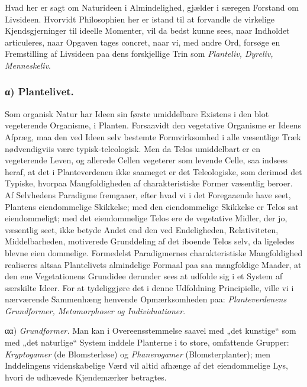 \documentclass[11pt]{book}
\newcommand{\opage}[1]{\marginnote{\footnotesize\textit{[#1]}}}
\begin{document}
\opage{291} \setcounter{footnote}{0}%
Hvad her er sagt om Naturideen i Almindelighed, gjælder i særegen
Forstand om Livsideen. Hvorvidt Philosophien her er istand til at
forvandle de virkelige Kjendsgjerninger til ideelle Momenter, vil da
bedst kunne sees, naar Indholdet articuleres, naar Opgaven tages concret,
naar vi, med andre Ord, forsøge en Fremstilling af Livsideen paa dens
forskjellige Trin som \emph{Planteliv, Dyreliv, Menneskeliv}.

\subsubsection*{α) Plantelivet.}

Som organisk Natur har Ideen sin første umiddelbare Existens i den blot
vegeterende Organisme, i Planten. Forsaavidt den vegetative Organisme er
Ideens Afpræg, maa den ved Ideen selv bestemte Formvirksomhed i alle
væsentlige Træk nødvendigviis være typisk-teleologisk. Men da Telos
umiddelbart er en vegeterende Leven, og allerede Cellen vegeterer som
levende Celle, saa indsees heraf, at det i Planteverdenen ikke saameget
er det Teleologiske, som derimod det Typiske, hvorpaa Mangfoldigheden af
charakteristiske Former væsentlig beroer. Af Selvhedens Paradigme
fremgaaer, efter hvad vi i det Foregaaende have seet, Plantens
eiendommelige Skikkelse; med den eiendommelige Skikkelse er Telos sat
eiendommeligt; med det eiendommelige Telos ere de vegetative Midler, der
jo, væsentlig seet, ikke betyde Andet end den ved Endeligheden,
Relativiteten, Middelbarheden, motiverede Grunddeling af det iboende
Telos selv, da ligeledes blevne eien\-%
\opage{292} \setcounter{footnote}{0}%
dommelige. Formedelst Paradigmernes charakteristiske Mangfoldighed
realiseres altsaa Plantelivets almindelige Formaal paa saa mangfoldige
Maader, at den ene Vegetationens Grundidee derunder sees at udfolde sig
i et System af særskilte Ideer. For at tydeliggjøre det i denne
Udfoldning Principielle, ville vi i nærværende Sammenhæng henvende
Opmærksomheden paa: \emph{Planteverdenens Grundformer, Metamorphoser og
Individuationer}.

αα) \emph{Grundformer.} Man kan i Overeensstemmelse saavel med „det
kunstige“ som med „det naturlige“ System inddele Planterne i to store,
omfattende Grupper: \emph{Kryptogamer} (de Blomsterløse) og
\emph{Phanerogamer} (Blomsterplanter); men Inddelingens videnskabelige
Værd vil altid afhænge af det eiendommelige Lys, hvori de udhævede
Kjendemærker betragtes.
\end{document}
